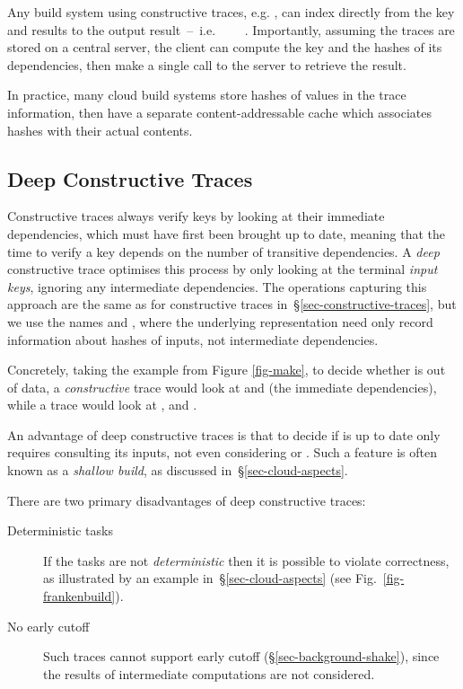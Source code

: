 Any  build system using constructive traces, e.g.
\CloudBuild, can index directly from the key and results to the output result~--~i.e.
~~\hs{[Hash}~\hs{v])}~. Importantly, assuming the traces
are stored on a central server, the client can compute the key and the hashes of
its dependencies, then make a single call to the server to retrieve the result.

In practice, many cloud build systems store hashes of values in the trace information,
then have a separate content-addressable cache which associates hashes with
their actual contents.

\subsection{Deep Constructive Traces}\label{sec-deep-constructive-traces}

Constructive traces always verify keys by looking at their immediate
dependencies, which must have first been brought up to date, meaning that the
time to verify a key depends on the number of transitive dependencies. A
\emph{deep} constructive trace optimises this process by only looking at the
terminal \emph{input keys}, ignoring any intermediate dependencies. The operations
capturing this approach are the same as for constructive traces
in~\S\ref{sec-constructive-traces}, but we use the names  and
, where the underlying  representation need only record
information about hashes of inputs, not intermediate dependencies.

Concretely, taking the example from Figure \ref{fig-make}, to decide whether 
is out of data, a \emph{constructive} trace would look at  and 
(the immediate dependencies), while a  trace would look at ,
 and .

An advantage of deep constructive traces is that to decide if  is up to date only
requires consulting its inputs, not even considering  or .
Such a feature is often known as a \emph{shallow build}, as discussed in~\S\ref{sec-cloud-aspects}.

There are two primary disadvantages of deep constructive traces:

\begin{description}
\item[Deterministic tasks] If the tasks are not \emph{deterministic} then it is possible to
violate correctness, as illustrated by an example in~\S\ref{sec-cloud-aspects}
(see Fig.~\ref{fig-frankenbuild}).
\item[No early cutoff] Such traces cannot support early cutoff
(\S\ref{sec-background-shake}), since the results of intermediate computations are not considered.
\end{description}

